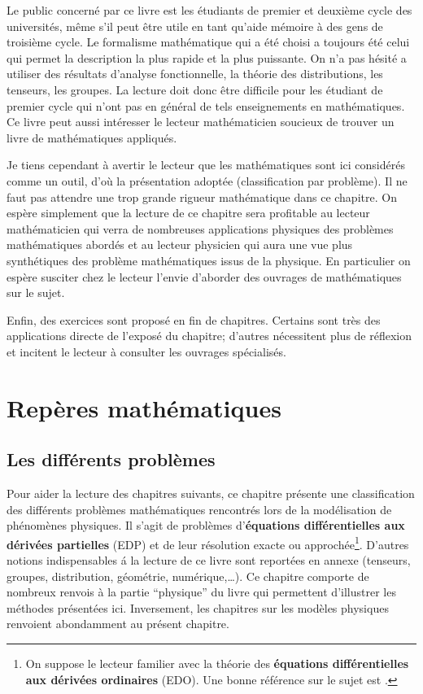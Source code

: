 \documentclass[12pt]{book}
\begin{document}
Le public concern\'e par ce livre est les \'etudiants de premier et
deuxi\`eme cycle des universit\'es, m\^eme s'il peut \^etre utile en
tant qu'aide m\'emoire \`a des gens de troisi\`eme cycle.
Le formalisme math\'ematique qui a \'et\'e choisi a toujours \'et\'e
celui qui permet la description la plus rapide et la plus puissante.
On n'a pas h\'esit\'e a utiliser des r\'esultats d'analyse
fonctionnelle, la th\'eorie des distributions, les tenseurs, les
groupes. La lecture doit donc \^etre difficile pour les \'etudiant de
premier cycle qui n'ont pas en g\'en\'eral de tels enseignements en
math\'ematiques. 
Ce livre peut aussi int\'eresser le lecteur math\'ematicien soucieux de
trouver un livre de math\'ematiques appliqu\'es.

Je tiens cependant \`a avertir le lecteur que les math\'ematiques sont
ici consid\'er\'es comme un outil, 
d'o\`u la pr\'esentation adopt\'ee (classification par probl\`eme). Il
ne faut pas attendre une trop grande rigueur math\'ematique dans ce
chapitre. On esp\`ere simplement que la lecture de ce chapitre sera profitable
au 
lecteur math\'ematicien qui verra de nombreuses applications physiques
des probl\`emes math\'ematiques abord\'es et au lecteur physicien qui
aura une vue plus synth\'etiques des probl\`eme math\'ematiques issus
de la physique. En particulier on esp\`ere susciter chez le lecteur
l'envie d'aborder des ouvrages de math\'ematiques sur le sujet.

Enfin, des exercices sont propos\'e en fin de chapitres. Certains sont tr\`es
des applications directe de l'expos\'e du chapitre; d'autres n\'ecessitent
plus de r\'eflexion et incitent le lecteur \`a consulter les ouvrages
sp\'ecialis\'es. 




\chapter{Rep\`eres math\'ematiques}\label{chapprob}
\section{Les diff\'erents probl\`emes}
Pour aider la lecture des chapitres suivants, ce chapitre pr\'esente une
classification des diff\'erents probl\`emes math\'ematiques rencontr\'es lors
de la mod\'elisation de ph\'enom\`enes physiques.
Il s'agit de probl\`emes d'{\bf \'equations diff\'erentielles aux d\'eriv\'ees
partielles} (EDP) et de leur r\'esolution exacte ou approch\'ee\footnote{On
suppose le lecteur familier avec la th\'eorie des {\bf \'equations
  diff\'erentielles aux d\'eriv\'ees ordinaires} (EDO). Une bonne
r\'ef\'erence sur le sujet est \cite{ma:equad:Arnold80}.}.
D'autres notions indispensables \'a la lecture de ce livre sont report\'ees en
annexe (tenseurs, groupes, distribution, g\'eom\'etrie, num\'erique,\dots).
Ce chapitre comporte de nombreux renvois \`a la partie ``physique'' du livre
qui 
permettent d'illustrer les m\'ethodes pr\'esent\'ees ici. Inversement, les
chapitres sur les mod\`eles physiques renvoient abondamment au pr\'esent
chapitre. 
\end{document}
